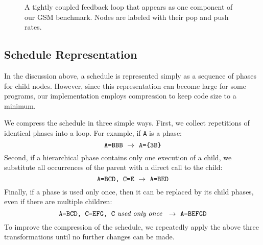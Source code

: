 \documentclass{sig-alt-full}
\begin{document}
\begin{figure*}[t]
\centering
{}
\vspace{-4pt}
\caption{\small Phased minimum latency schedule for one steady state
execution of the feedback loop of Figure~\ref{fig:gsm}.  Nodes are
labeled with the number of times they fire in a given phase.  No
single appearance schedule exists for this
loop.\protect\label{fig:gsm-phases}}
\vspace{-3pt}
\end{figure*}

\begin{figure}
\begin{center}
\vspace{-6pt}
\vspace{-6pt}
\caption{\small A tightly coupled feedback loop that appears as one component
of our GSM benchmark.  Nodes are labeled with their pop and push
rates.  \protect\label{fig:gsm}}
\end{center}
\vspace{-12pt}
\end{figure}

\subsection{Schedule Representation}
\label{sec:schedrep}

In the discussion above, a schedule is represented simply as a
sequence of phases for child nodes.  However, since this
representation can become large for some programs, our implementation
employs compression to keep code size to a minimum.  

We compress the schedule in three simple ways.  First, we collect
repetitions of identical phases into a loop.  For example, if {\tt A}
is a phase:
\[
\mbox{{\tt A=BBB}} ~\rightarrow~ \mbox{{\tt A=\{3B\}}}
\]
Second, if a hierarchical phase contains only one execution of a
child, we substitute all occurrences of the parent with a direct call
to the child:
\[
\mbox{{\tt A=BCD, C=E}} ~\rightarrow~ \mbox{{\tt A=BED}}
\]
Finally, if a phase is used only once, then it can be replaced by its
child phases, even if there are multiple children:
\[
\mbox{{\tt A=BCD, C=EFG, C}}~\mbox{\it used}~\mbox{\it only}~\mbox{\it once}~ ~\rightarrow~ \mbox{{\tt A=BEFGD}}
\]
To improve the compression of the schedule, we repeatedly apply the
above three transformations until no further changes can be made.

\end{document}
